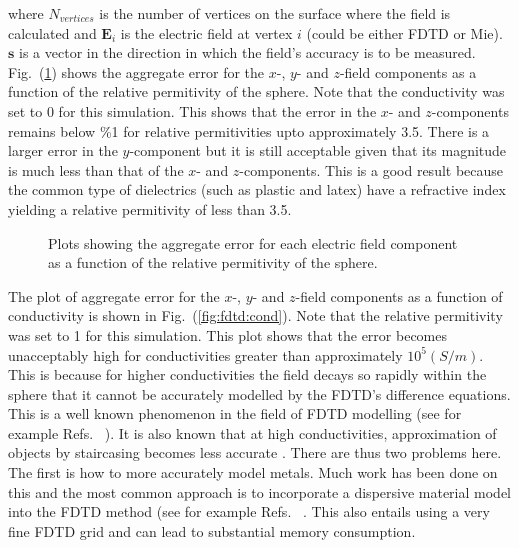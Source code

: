\documentclass[a4paper, 12pt]{article}
\newcommand{\rfig}[1]{Fig.\ (\ref{#1})}
\newcommand{\refs}{Refs.\ }
\begin{document}
	where $N_{vertices}$ is the number of vertices on the surface where
	the field is calculated and $\mathbf{E}_i$ is the electric field at
	vertex $i$ (could be either FDTD or Mie). $\mathbf{s}$ is a vector in the
	direction in which the field's accuracy is to be
	measured. \rfig{fig:fdtd:relperm} shows the aggregate error for the
	$x$-, $y$- and $z$-field components as a function of the relative
	permitivity of the sphere. Note that the conductivity was set to 0 for
	this simulation. This shows that the error in the $x$- and
	$z$-components remains below \%1 for relative permitivities upto
	approximately 3.5. There is a larger error in the $y$-component but it
	is still acceptable given that its magnitude is much less than that
	of the $x$- and $z$-components. This is a good result because the
	common type of dielectrics (such as plastic and latex) have a
	refractive index yielding a relative permitivity of less than 3.5. 
	\begin{figure}[!h]
		\begin{center}
			\caption{Plots showing the aggregate error for each electric field
				component as a function of the relative permitivity of the sphere.}
			\label{fig:fdtd:relperm}
		\end{center}
	\end{figure}
	The plot of aggregate error for the
	$x$-, $y$- and $z$-field components as a function of conductivity is
	shown in \rfig{fig:fdtd:cond}. Note
	that the relative permitivity was set to 1 for this
	simulation. This plot shows that the error becomes unacceptably
	high for conductivities greater than approximately
	$10^5(S/m)$. This is because for higher conductivities the field
	decays so rapidly within the sphere that it cannot be accurately modelled by the
	FDTD's difference equations. This is a well known phenomenon in the
	field of FDTD modelling (see for example \refs
	\cite{penney96ieeetransantprop434,berghe98ieeemicgwlet}). It is
	also known that at high conductivities, approximation of objects by
	staircasing becomes less accurate
	\cite{holland93ieeetranseleccomp434}. There are thus two problems
	here. The first is how to more accurately model metals. Much work
	has been done on this  and the most common approach is to
	incorporate a dispersive material model into the FDTD method (see for example \refs
	\cite{cummer97ieeetransantprop392,judkins95josaa1974}. This
	also entails using a very fine FDTD grid and can lead to
	substantial memory consumption. 
	
\end{document}
